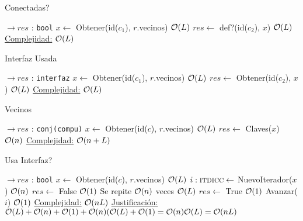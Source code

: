 \begin{Algoritmos}
\begin{algorithm}
\caption{Conectadas?}
\begin{algorithmic}[1]
    $\to res$ : \texttt{bool}
  \State $x \gets$ Obtener(id($c_1$), $r$.vecinos) \Comment $\mathcal{O}(L)$
  \State $res \gets$ def?(id($c_2$), $x$) \Comment $\mathcal{O}(L)$
 \EndProcedure
 \underline{Complejidad:} $\mathcal{O}(L)$
\end{algorithmic}
\end{algorithm}


\begin{algorithm}
\caption{Interfaz Usada}
\begin{algorithmic}[1]
   $\to res$ : \texttt{interfaz}
  \State $x \gets$ Obtener(id($c_1$), $r$.vecinos) \Comment $\mathcal{O}(L)$
  \State $res \gets$ Obtener(id($c_2$), $x$) \Comment $\mathcal{O}(L)$
 \EndProcedure
 \underline{Complejidad:} $\mathcal{O}(L)$
\end{algorithmic}
\end{algorithm}


\begin{algorithm}
\caption{Vecinos}
\begin{algorithmic}[1]
    $\to res$ : \texttt{conj(compu)}
  \State $x \gets$ Obtener(id($c$), $r$.vecinos) \Comment $\mathcal{O}(L)$
  \State $res \gets$ Claves($x$) \Comment $\mathcal{O}(n)$
 \EndProcedure
 \underline{Complejidad:} $\mathcal{O}(n+L)$
\end{algorithmic}
\end{algorithm}



\begin{algorithm}
\caption{Usa Interfaz?}
\begin{algorithmic}[1]
   $\to res$ : \texttt{bool} 
  \State $x \gets$ Obtener(id($c$), $r$.vecinos) \Comment $\mathcal{O}(L)$
  \State $i :\textsc{itdicc} \gets$ NuevoIterador($x$) \Comment $\mathcal{O}(n)$
  \State $res \gets$ False \Comment $\mathcal{O}(1)$
   \Comment Se repite $\mathcal{O}(n)$ veces
      \Comment $\mathcal{O}(L)$
       \State $res \gets$ True  \Comment $\mathcal{O}(1)$
    \EndIf
    \State Avanzar($i$) \Comment $\mathcal{O}(1)$
  \EndWhile
 \EndProcedure
 \underline{Complejidad:} $\mathcal{O}(nL)$
 \underline{Justificación:} $\mathcal{O}(L) + \mathcal{O}(n) + \mathcal{O}(1) + \mathcal{O}(n)(\mathcal{O}(L) + \mathcal{O}(1) = \mathcal{O}(n)\mathcal{O}(L) = \mathcal{O}(nL)$
\end{algorithmic}
\end{algorithm}



\end{Algoritmos}

